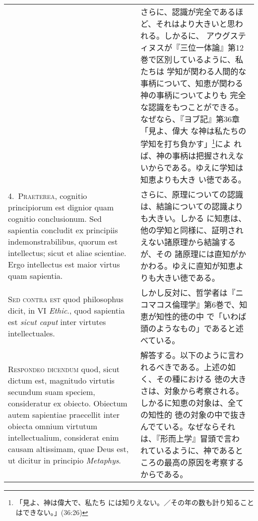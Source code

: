 \documentclass[10pt]{jsarticle}
\begin{document}
\begin{longtable}{p{21em}p{21em}}
&

 さらに、認識が完全であるほど、それはより大きいと思われる。しかるに、
 アウグスティヌスが『三位一体論』第12巻で区別しているように、私たちは
 学知が関わる人間的な事柄について、知恵が関わる神の事柄についてよりも
 完全な認識をもつことができる。なぜなら、『ヨブ記』第36章「見よ、偉大
 な神は私たちの学知を打ち負かす」\footnote{「見よ、神は偉大で、私たち
 には知りえない。／その年の数も計り知ることはできない。」(36:26)}によ
 れば、神の事柄は把握されえないからである。ゆえに学知は知恵よりも大き
 い徳である。

\\



4.~{\scshape Praeterea}, cognitio principiorum est dignior quam
cognitio conclusionum. Sed sapientia concludit ex principiis
indemonstrabilibus, quorum est intellectus; sicut et aliae
scientiae. Ergo intellectus est maior virtus quam sapientia.


&

 さらに、原理についての認識は、結論についての認識よりも大きい。しかる
 に知恵は、他の学知と同様に、証明されえない諸原理から結論するが、その
 諸原理には直知がかかわる。ゆえに直知が知恵よりも大きい徳である。

\\




{\scshape Sed contra est} quod philosophus dicit, in VI {\itshape
Ethic}., quod sapientia est {\itshape sicut caput} inter virtutes
intellectuales.


&

 しかし反対に、哲学者は『ニコマコス倫理学』第6巻で、知恵が知性的徳の中
 で「いわば頭のようなもの」であると述べている。

\\




{\scshape Respondeo dicendum} quod, sicut dictum est, magnitudo
virtutis secundum suam speciem, consideratur ex obiecto. Obiectum
autem sapientiae praecellit inter obiecta omnium virtutum
intellectualium, considerat enim causam altissimam, quae Deus est, ut
 dicitur in principio {\itshape Metaphys}.


&

 解答する。以下のように言われるべきである。上述の如く、その種における
 徳の大きさは、対象から考察される。しかるに知恵の対象は、全ての知性的
 徳の対象の中で抜きんでている。なぜならそれは、『形而上学』冒頭で言わ
 れているように、神であるところの最高の原因を考察するからである。
 

\end{longtable}
\end{document}
